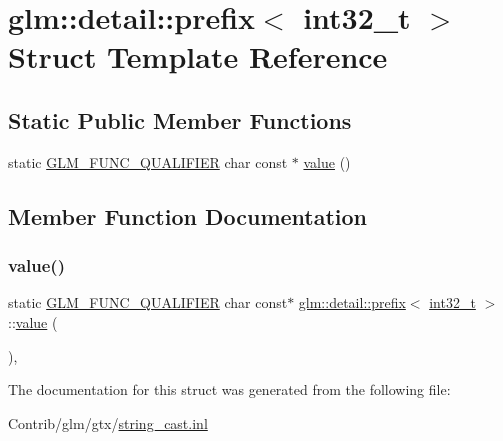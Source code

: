 \hypertarget{structglm_1_1detail_1_1prefix_3_01int32__t_01_4}{}\section{glm\+:\+:detail\+:\+:prefix$<$ int32\+\_\+t $>$ Struct Template Reference}
\label{structglm_1_1detail_1_1prefix_3_01int32__t_01_4}
\subsection*{Static Public Member Functions}
\begin{DoxyCompactItemize}
\item 
static \mbox{\hyperlink{setup_8hpp_a33fdea6f91c5f834105f7415e2a64407}{G\+L\+M\+\_\+\+F\+U\+N\+C\+\_\+\+Q\+U\+A\+L\+I\+F\+I\+ER}} char const  $\ast$ \mbox{\hyperlink{structglm_1_1detail_1_1prefix_3_01int32__t_01_4_a1e2bfac810e1195fa173ebca0dcdca57}{value}} ()
\end{DoxyCompactItemize}


\subsection{Member Function Documentation}
\mbox{\label{structglm_1_1detail_1_1prefix_3_01int32__t_01_4_a1e2bfac810e1195fa173ebca0dcdca57}} 
\subsubsection{\texorpdfstring{value()}{value()}}
{\footnotesize\ttfamily static \mbox{\hyperlink{setup_8hpp_a33fdea6f91c5f834105f7415e2a64407}{G\+L\+M\+\_\+\+F\+U\+N\+C\+\_\+\+Q\+U\+A\+L\+I\+F\+I\+ER}} char const$\ast$ \mbox{\hyperlink{structglm_1_1detail_1_1prefix}{glm\+::detail\+::prefix}}$<$ \mbox{\hyperlink{group__gtc__type__precision_gab870c0eb6f525b0c8c4716762e0fc3a8}{int32\+\_\+t}} $>$\+::\mbox{\hyperlink{_s_d_l__opengl__glext_8h_a8ad81492d410ff2ac11f754f4042150f}{value}} (\begin{DoxyParamCaption}{ }\end{DoxyParamCaption})\hspace{0.3cm}{\ttfamily [inline]}, {\ttfamily [static]}}



The documentation for this struct was generated from the following file\+:\begin{DoxyCompactItemize}
\item 
Contrib/glm/gtx/\mbox{\hyperlink{string__cast_8inl}{string\+\_\+cast.\+inl}}\end{DoxyCompactItemize}
